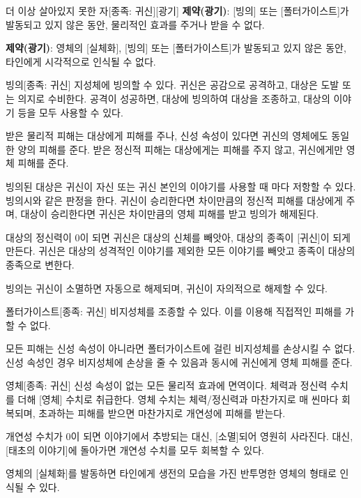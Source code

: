 \documentclass{report}
\begin{document}
	\begin{story}{더 이상 살아있지 못한 자}{[종족: 귀신][광기]}
		\textbf{제약(광기)}: [빙의] 또는 [폴터가이스트]가 발동되고 있지 않은 동안, 물리적인 효과를 주거나 받을 수 없다.
		
		\textbf{제약(광기)}: 영체의 [실체화], [빙의] 또는 [폴터가이스트]가 발동되고 있지 않은 동안, 타인에게 시각적으로 인식될 수 없다.
		
	\end{story}
	
	\begin{story}{빙의}{[종족: 귀신]}
		지성체에 빙의할 수 있다. 귀신은 공감으로 공격하고, 대상은 도발 또는 의지로 수비한다. 공격이 성공하면, 대상에 빙의하여 대상을 조종하고, 대상의 이야기 등을 모두 사용할 수 있다.
		
		받은 물리적 피해는 대상에게 피해를 주나, 신성 속성이 있다면 귀신의 영체에도 동일한 양의 피해를 준다. 받은 정신적 피해는 대상에게는 피해를 주지 않고, 귀신에게만 영체 피해를 준다.
		
		빙의된 대상은 귀신이 자신 또는 귀신 본인의 이야기를 사용할 때 마다 저항할 수 있다. 빙의시와 같은 판정을 한다. 귀신이 승리한다면 차이만큼의 정신적 피해를 대상에게 주며, 대상이 승리한다면 귀신은 차이만큼의 영체 피해를 받고 빙의가 해제된다.
		
		대상의 정신력이 0이 되면 귀신은 대상의 신체를 빼앗아, 대상의 종족이 [귀신]이 되게 만든다. 귀신은 대상의 성격적인 이야기를 제외한 모든 이야기를 빼앗고 종족이 대상의 종족으로 변한다.
		
		빙의는 귀신이 소멸하면 자동으로 해제되며, 귀신이 자의적으로 해제할 수 있다.
		
	\end{story}
	
	\begin{story}{폴터가이스트}{[종족: 귀신]}
		비지성체를 조종할 수 있다. 이를 이용해 직접적인 피해를 가할 수 없다.
		
		모든 피해는 신성 속성이 아니라면 폴터가이스트에 걸린 비지성체를 손상시킬 수 없다. 신성 속성인 경우 비지성체에 손상을 줄 수 있음과 동시에 귀신에게 영체 피해를 준다.
		
	\end{story}
	
	\begin{story}{영체}{[종족: 귀신]}
		신성 속성이 없는 모든 물리적 효과에 면역이다. 체력과 정신력 수치를 더해 [영체] 수치로 취급한다. 영체 수치는 체력/정신력과 마찬가지로 매 씬마다 회복되며, 초과하는 피해를 받으면 마찬가지로 개연성에 피해를 받는다.
		
		개연성 수치가 0이 되면 이야기에서 추방되는 대신, [소멸]되어 영원히 사라진다. 대신, [태초의 이야기]에 돌아가면 개연성 수치를 모두 회복할 수 있다.
		
		영체의 [실체화]를 발동하면 타인에게 생전의 모습을 가진 반투명한 영체의 형태로 인식될 수 있다.
		
	\end{story}
\end{document}
